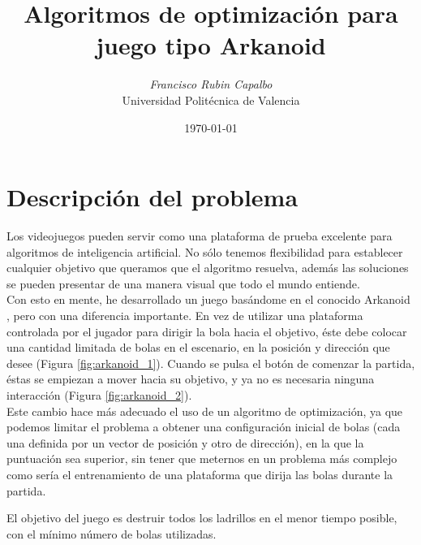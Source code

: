 \documentclass[a4paper, 11pt]{article}
\title{\Large{\textbf{Algoritmos de optimización para juego tipo Arkanoid}}}
\author{\textit{Francisco Rubin Capalbo}\\
		Universidad Politécnica de Valencia }
\date{\today}
\begin{document}
    
    \maketitle
    \section{Descripción del problema}
    Los videojuegos pueden servir como una plataforma de prueba excelente para algoritmos de inteligencia artificial. No sólo tenemos flexibilidad para establecer cualquier objetivo que queramos que el algoritmo resuelva, además las soluciones se pueden presentar de una manera visual que todo el mundo entiende. \\
    
    Con esto en mente, he desarrollado un juego basándome en el conocido Arkanoid \cite{arkanoid}, pero con una diferencia importante. En vez de utilizar una plataforma controlada por el jugador para dirigir la bola hacia el objetivo, éste debe colocar una cantidad limitada de bolas en el escenario, en la posición y dirección que desee (Figura \ref{fig:arkanoid_1}). Cuando se pulsa el botón de comenzar la partida, éstas se empiezan a mover hacia su objetivo, y ya no es necesaria ninguna interacción (Figura \ref{fig:arkanoid_2}). \\
    
    Este cambio hace más adecuado el uso de un algoritmo de optimización, ya que podemos limitar el problema a obtener una configuración inicial de bolas (cada una definida por un vector de posición y otro de dirección), en la que la puntuación sea superior, sin tener que meternos en un problema más complejo como sería el entrenamiento de una plataforma que dirija las bolas durante la partida.
    
    El objetivo del juego es destruir todos los ladrillos en el menor tiempo posible, con el mínimo número de bolas utilizadas.
    
\end{document}
